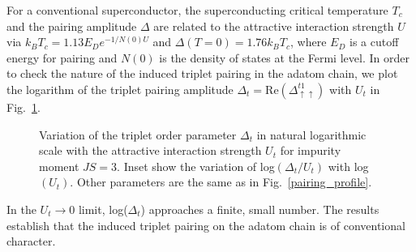 \documentclass[aps,prl,reprint,nobibnotes]{revtex4-1}
\begin{document}
For a conventional superconductor, the superconducting critical temperature $T_c$ and the pairing amplitude $\Delta$ are related to the attractive interaction strength $U$ via $k_{B}T_c =1.13 E_D e^{-1/N(0)U}$ and $\Delta (T=0)=1.76k_{B}T_c$, where $E_D$ is a cutoff energy for pairing and $N(0)$ is the density of states at the Fermi level. In order to check the nature of the induced triplet pairing in the adatom chain, we plot the logarithm of the triplet pairing amplitude $\Delta_t=\text{Re}(\Delta_{\uparrow \uparrow}^{t1})$ with $U_t$ in Fig.~\ref{triplet_log_plot}. 
\begin{figure}[htb!]
\begin{center}
\caption{Variation of the triplet order parameter $\Delta_t$ in natural logarithmic scale with the attractive interaction strength $U_t$ for impurity moment $JS=3$. Inset show the variation of log$(\Delta_t/U_t)$ with log$(U_t)$. Other parameters are the same as in Fig.~\ref{pairing_profile}.} 
\label{triplet_log_plot}
\end{center}
\end{figure}
In the $U_t \rightarrow 0$ limit, log($\Delta_t$) approaches a finite, small number. The results establish that the induced triplet pairing on the adatom chain is of conventional character.  
\end{document}
